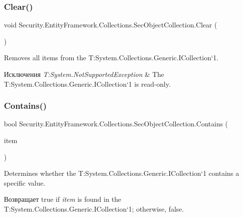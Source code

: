 \subsubsection{\texorpdfstring{Clear()}{Clear()}}
{\footnotesize\ttfamily void Security.\+Entity\+Framework.\+Collections.\+Sec\+Object\+Collection.\+Clear (\begin{DoxyParamCaption}{ }\end{DoxyParamCaption})}



Removes all items from the T\+:\+System.\+Collections.\+Generic.\+I\+Collection`1. 


\begin{DoxyExceptions}{Исключения}
{\em T\+:\+System.\+Not\+Supported\+Exception} & The T\+:\+System.\+Collections.\+Generic.\+I\+Collection`1 is read-\/only. \\
\hline
\end{DoxyExceptions}
\mbox{\label{class_security_1_1_entity_framework_1_1_collections_1_1_sec_object_collection_a41da3889a4c5935d51c523244b133339}} 
\subsubsection{\texorpdfstring{Contains()}{Contains()}}
{\footnotesize\ttfamily bool Security.\+Entity\+Framework.\+Collections.\+Sec\+Object\+Collection.\+Contains (\begin{DoxyParamCaption}\item[{\hyperlink{interface_security_1_1_interfaces_1_1_model_1_1_i_sec_object}{I\+Sec\+Object}}]{item }\end{DoxyParamCaption})}



Determines whether the T\+:\+System.\+Collections.\+Generic.\+I\+Collection`1 contains a specific value. 

\begin{DoxyReturn}{Возвращает}
true if {\itshape item}  is found in the T\+:\+System.\+Collections.\+Generic.\+I\+Collection`1; otherwise, false. 
\end{DoxyReturn}

